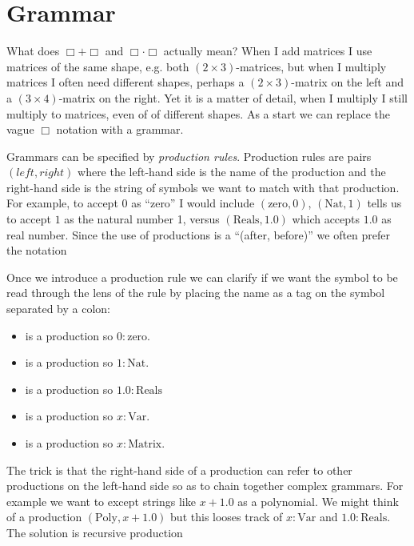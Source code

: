 \section{Grammar}
What does $\Box+\Box$ and $\Box\cdot \Box$ actually mean?  When I add matrices I
use matrices of the same shape, e.g. both $(2\times 3)$-matrices,  but when I
multiply matrices I often need different shapes, perhaps a $(2\times 3)$-matrix
on the left and a $(3\times 4)$-matrix on the right.  Yet it is a matter of
detail, when I multiply I still multiply to matrices, even of of different
shapes. As a start we can replace the vague $\Box$ notation with a grammar.

Grammars can be specified by \emph{production rules}.  Production rules are
pairs $(left,right)$ where the left-hand side is the name of the production and
the right-hand side is the string of symbols we want to match with that
production.  For example, to accept $0$ as ``zero'' I would include
$(\text{zero},0)$, $(\text{Nat},1)$ tells us to accept $1$ as the natural 
number 1, versus $(\text{Reals},1.0)$ which accepts $1.0$ as real number.
Since the use of productions is a ``(after, before)'' we often prefer 
the notation 
\begin{center}
\end{center}
Once we introduce a production rule we can clarify if we want the symbol 
to be read through the lens of the rule by placing the name as a 
tag on the symbol separated by a colon:
\begin{itemize}
\item 
     is a production so  $0:\text{zero}$.
\item 
     is a production so  $1:\text{Nat}$.
\item 
     is a production so  $1.0:\text{Reals}$
\item 
     is a production so  $x:\text{Var}$. 
\item 
     is a production so  $x:\text{Matrix}$. 
\end{itemize}
The trick is that the right-hand side of a production can refer to 
other productions on the left-hand side so as to chain
together complex grammars.  For example we want to except strings like $x+1.0$
as a polynomial.  We might think of a  production  
$(\text{Poly},x+1.0)$ but this looses track of $x:\text{Var}$ and 
$1.0:\text{Reals}$.  The solution is recursive production 
\begin{center}
\end{center}

